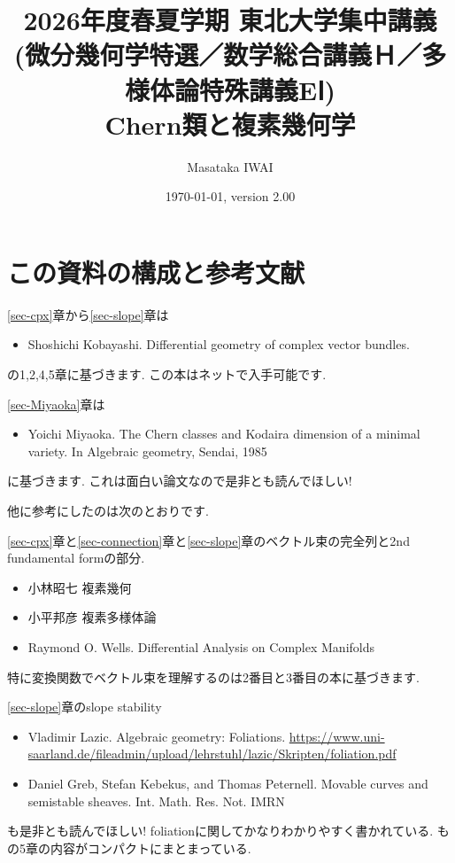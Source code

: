 \documentclass[dvipdfmx,a4paper,11pt]{article} %
\title{2026年度春夏学期 東北大学集中講義 \\ (微分幾何学特選／数学総合講義Ｈ／多様体論特殊講義EⅠ)\\Chern類と複素幾何学}
\author{Masataka IWAI}
\date{\today, version 2.00}
\theoremstyle{definition}
\theoremstyle{remark}
\numberwithin{equation}{section}
\begin{document}
\maketitle
%
\begin{abstract}

\end{abstract}
%
\setcounter{tocdepth}{2}
\tableofcontents


\newpage
\setcounter{section}{-1}
\section{この資料の構成と参考文献}

\ref{sec-cpx}章から\ref{sec-slope}章は
\begin{itemize}
\item \cite{Kob14} Shoshichi Kobayashi. Differential geometry of complex vector bundles. 
\end{itemize}
の1,2,4,5章に基づきます. この本はネットで入手可能です. 

\ref{sec-Miyaoka}章は
\begin{itemize}
\item \cite{Miy87} Yoichi Miyaoka. The Chern classes and Kodaira dimension of a minimal variety.
In Algebraic geometry, Sendai, 1985
\end{itemize}
に基づきます. これは面白い論文なので是非とも読んでほしい!

他に参考にしたのは次のとおりです. 

\ref{sec-cpx}章と\ref{sec-connection}章と\ref{sec-slope}章のベクトル束の完全列と2nd fundamental formの部分.
\begin{itemize}
\item 小林昭七 複素幾何
\item 小平邦彦 複素多様体論
\item Raymond O. Wells. Differential Analysis on Complex Manifolds
\end{itemize}
 特に変換関数でベクトル束を理解するのは2番目と3番目の本に基づきます. 

\ref{sec-slope}章のslope stability
\begin{itemize}
\item \cite{Lazicnote} Vladimir Lazic. Algebraic geometry: Foliations. \url{https://www.uni-saarland.de/fileadmin/upload/lehrstuhl/lazic/Skripten/foliation.pdf}
\item \cite{GKP16a} Daniel Greb, Stefan Kebekus, and Thomas Peternell. Movable curves and semistable sheaves. Int. Math. Res. Not. IMRN
\end{itemize}
\cite{Lazicnote}も是非とも読んでほしい!
foliationに関してかなりわかりやすく書かれている. \cite{GKP16a}も\cite{Kob14}の5章の内容がコンパクトにまとまっている. 
\end{document}
